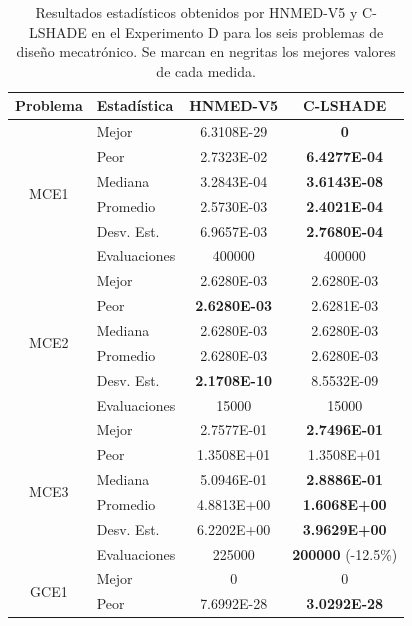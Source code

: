 \begin{table}
	\centering
	\caption[Resultados estadísticos obtenidos por HNMED-V5 y C-LSHADE
	 en el Experimento D para los seis problemas de diseño mecatrónico.]{Resultados estadísticos obtenidos por HNMED-V5 y C-LSHADE
	 	en el Experimento D para los seis problemas de diseño mecatrónico. Se marcan en negritas los
		mejores valores de cada medida.}\label{tab:Resultados estadísticos obtenidos por HNMED-V5 y el algoritmo C-LSHADE en los seis problemas de diseño mecatrónico}
	\begin{tabular}{clcc} 
		\hline
		Problema              & Estadística   & HNMED-V5 & C-LSHADE  \\ 
		\hline
		\multirow{6}{*}{MCE1} & Mejor        & 6.3108E-29 & \textbf{0 }      \\
		& Peor         &2.7323E-02&  \textbf{6.4277E-04}  \\
		& Mediana      &3.2843E-04&\textbf{3.6143E-08}     \\
		& Promedio     &2.5730E-03& \textbf{ 2.4021E-04 } \\
		& Desv. Est.   &6.9657E-03&\textbf{ 2.7680E-04}\\
		& Evaluaciones &400000   &  400000       \\
		\hline
		\multirow{6}{*}{MCE2} & Mejor        &2.6280E-03&2.6280E-03
		\\
		& Peor         &\textbf{2.6280E-03}&2.6281E-03                \\
		& Mediana      &2.6280E-03&2.6280E-03   \\
		& Promedio     &2.6280E-03&2.6280E-03    \\
		& Desv. Est.   &\textbf{2.1708E-10}&8.5532E-09 \\
		& Evaluaciones &15000&15000                \\
		\hline
		\multirow{6}{*}{MCE3} & Mejor        &2.7577E-01&\textbf{2.7496E-01}  \\
		& Peor         &1.3508E+01&1.3508E+01     \\
		& Mediana      &5.0946E-01&\textbf{2.8886E-01} \\
		& Promedio     &4.8813E+00&\textbf{1.6068E+00}\\
		& Desv. Est.   &6.2202E+00&\textbf{3.9629E+00}\\
		& Evaluaciones &225000& \textbf{200000} (-12.5\%) \\
		\hline
		\multirow{6}{*}{GCE1} & Mejor        &0&0\\
		& Peor         &7.6992E-28&\textbf{3.0292E-28}\\

\end{tabular}
\end{table}
